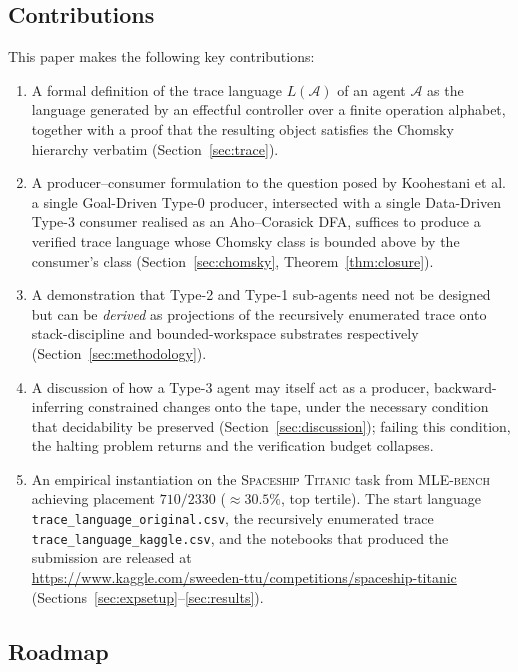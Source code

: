 \subsection{Contributions}

This paper makes the following key contributions:

\begin{enumerate}
\item A formal definition of the trace language $L(\mathcal{A})$
of an agent $\mathcal{A}$ as the language generated by an
effectful controller over a finite operation alphabet, together
with a proof that the resulting object satisfies the Chomsky
hierarchy verbatim (Section~\ref{sec:trace}).

\item A producer--consumer formulation to the question posed by 
Koohestani et al.\:  a single Goal-Driven
Type-0 producer, intersected with a single Data-Driven Type-3
consumer realised as an Aho--Corasick DFA, suffices to produce a
verified trace language whose Chomsky class is bounded above by
the consumer's class (Section~\ref{sec:chomsky},
Theorem~\ref{thm:closure}).
\item A demonstration that Type-2 and Type-1 sub-agents need not
be designed but can be \emph{derived} as projections of the
recursively enumerated trace onto stack-discipline and
bounded-workspace substrates respectively
(Section~\ref{sec:methodology}).
\item A discussion of how a Type-3 agent may itself act as a
producer, backward-inferring constrained changes onto the tape,
under the necessary condition that decidability be preserved
(Section~\ref{sec:discussion}); failing this condition, the
halting problem returns and the verification budget collapses.
\item An empirical instantiation on the \textsc{Spaceship Titanic}
task from \textsc{MLE-bench} achieving placement $710/2330$
($\approx\!30.5\%$, top tertile).  The start language
\texttt{trace\_language\_original.csv}, the recursively
enumerated trace \texttt{trace\_language\_kaggle.csv}, and the
notebooks that produced the submission are released at\\
\url{https://www.kaggle.com/sweeden-ttu/competitions/spaceship-titanic}\\
(Sections~\ref{sec:expsetup}--\ref{sec:results}).
\end{enumerate}

\subsection{Roadmap}

